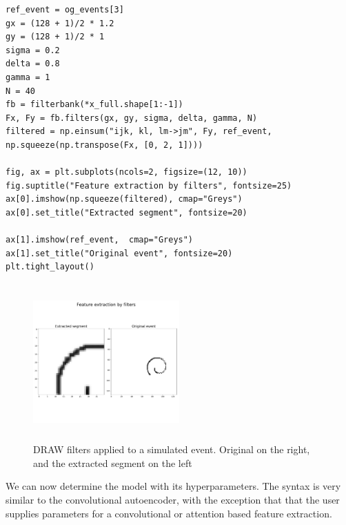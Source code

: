 \begin{minipage}{\linewidth}
\begin{lstlisting}[language=iPython]
ref_event = og_events[3]
gx = (128 + 1)/2 * 1.2
gy = (128 + 1)/2 * 1
sigma = 0.2
delta = 0.8
gamma = 1
N = 40
fb = filterbank(*x_full.shape[1:-1])
Fx, Fy = fb.filters(gx, gy, sigma, delta, gamma, N)
filtered = np.einsum("ijk, kl, lm->jm", Fy, ref_event, np.squeeze(np.transpose(Fx, [0, 2, 1])))

fig, ax = plt.subplots(ncols=2, figsize=(12, 10))
fig.suptitle("Feature extraction by filters", fontsize=25)
ax[0].imshow(np.squeeze(filtered), cmap="Greys")
ax[0].set_title("Extracted segment", fontsize=20)

ax[1].imshow(ref_event,  cmap="Greys")
ax[1].set_title("Original event", fontsize=20)
plt.tight_layout()
\end{lstlisting}
\end{minipage}
\begin{figure}[H]
	\centering
	\includegraphics[width=0.5\textwidth, height=6cm]{filtered.pdf}
	\caption[DRAW filters applied to simulated event]{DRAW filters applied to a simulated event. Original on the right, and the extracted segment on the left}
	\label{fig:draw_filter}
\end{figure}

\noindent We can now determine the model with its hyperparameters. The syntax is very similar to the convolutional autoencoder, with the exception that that the user supplies parameters for a convolutional or attention based feature extraction.

